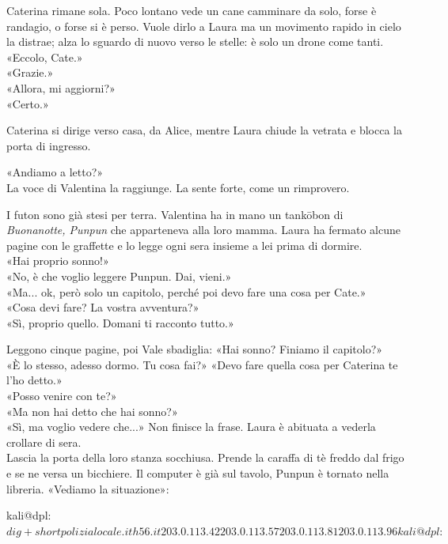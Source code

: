 \documentclass[10pt,oneside]{extbook}
\begin{document}
\par\medskip
Caterina rimane sola. Poco lontano vede un cane camminare da solo, forse \`e randagio, o forse si \`e perso. Vuole dirlo a Laura ma un movimento rapido in cielo la distrae; alza lo sguardo di nuovo verso le stelle: \`e solo un drone come tanti.\\
«Eccolo, Cate.»\\
«Grazie.»\\
«Allora, mi aggiorni?»\\
«Certo.»

\par\medskip
Caterina si dirige verso casa, da Alice, mentre Laura chiude la vetrata e blocca la porta di ingresso.

\par\medskip
«Andiamo a letto?»\\
La voce di Valentina la raggiunge. La sente forte, come un rimprovero.

\par\medskip
I futon sono gi\`a stesi per terra. Valentina ha in mano un tankōbon di \textit{Buonanotte, Punpun} che apparteneva alla loro mamma.  Laura ha fermato alcune pagine con le graffette e lo legge ogni sera insieme a lei prima di dormire.\\
«Hai proprio sonno!»\\
«No, \`e che voglio leggere Punpun. Dai, vieni.»\\
«Ma... ok, per\`o solo un capitolo, perch\'e poi devo fare una cosa per Cate.»\\
«Cosa devi fare? La vostra avventura?»\\
«Sì, proprio quello. Domani ti racconto tutto.»


\par\medskip
Leggono cinque pagine, poi Vale sbadiglia:
«Hai sonno? Finiamo il capitolo?»\\
«\`E lo stesso, adesso dormo. Tu cosa fai?»
«Devo fare quella cosa per Caterina te l'ho detto.»\\
«Posso venire con te?»\\
«Ma non hai detto che hai sonno?»\\
«Sì, ma voglio vedere che...» Non finisce la frase. Laura \`e abituata a vederla crollare di sera.\\
Lascia la porta della loro stanza socchiusa. Prende la caraffa di t\`e freddo dal frigo e se ne versa  un bicchiere. Il computer \`e gi\`a sul tavolo, Punpun \`e tornato nella libreria.
«Vediamo la situazione»:
\begin{terminalbox}
kali@dpl:~$ dig +short polizialocale.ith56.it
203.0.113.42
203.0.113.57
203.0.113.81
203.0.113.96

kali@dpl:~$
\end{terminalbox}
\end{document}
